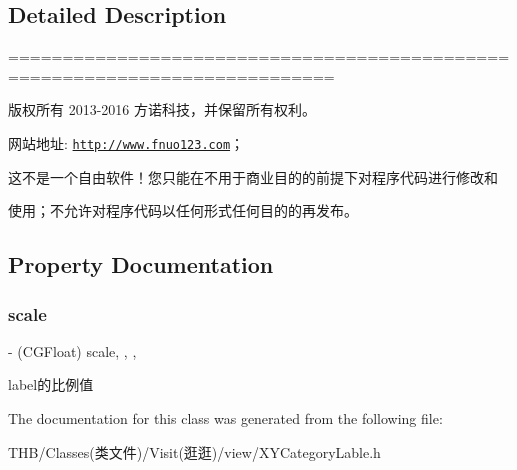 \subsection{Detailed Description}
============================================================================

版权所有 2013-\/2016 方诺科技，并保留所有权利。

网站地址\+: \href{http://www.fnuo123.com}{\tt http\+://www.\+fnuo123.\+com}； 



这不是一个自由软件！您只能在不用于商业目的的前提下对程序代码进行修改和

使用；不允许对程序代码以任何形式任何目的的再发布。 

 

\subsection{Property Documentation}
\mbox{\label{interface_x_y_category_lable_ac62f48570e659b6d242273c40f6ba691}} 
\subsubsection{\texorpdfstring{scale}{scale}}
{\footnotesize\ttfamily -\/ (C\+G\+Float) scale\hspace{0.3cm}{\ttfamily [read]}, {\ttfamily [write]}, {\ttfamily [nonatomic]}, {\ttfamily [assign]}}

label的比例值 

The documentation for this class was generated from the following file\+:\begin{DoxyCompactItemize}
\item 
T\+H\+B/\+Classes(类文件)/\+Visit(逛逛)/view/X\+Y\+Category\+Lable.\+h\end{DoxyCompactItemize}
